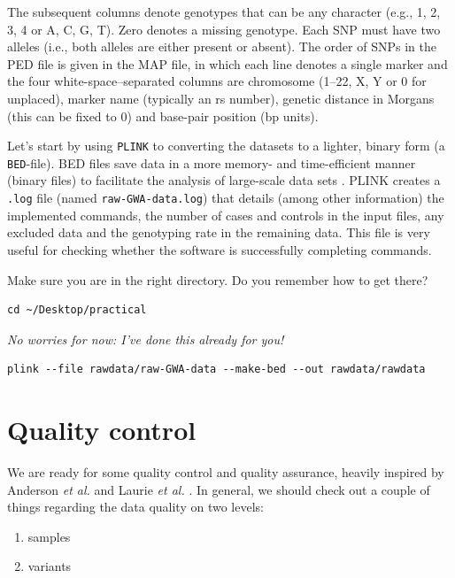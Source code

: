 \documentclass[
]{book}
\providecommand{\tightlist}{%
  \setlength{\itemsep}{0pt}\setlength{\parskip}{0pt}}
\begin{document}
The subsequent columns denote genotypes that can be any character (e.g., 1, 2, 3, 4 or A, C, G, T). Zero denotes a missing genotype. Each SNP must have two alleles (i.e., both alleles are either present or absent).
The order of SNPs in the PED file is given in the MAP file, in which each line denotes a single marker and the four white-space--separated columns are chromosome (1--22, X, Y or 0 for unplaced), marker name (typically an rs number), genetic distance in Morgans (this can be fixed to 0) and base-pair position (bp units).

Let's start by using \texttt{PLINK} to converting the datasets to a lighter, binary form (a \texttt{BED}-file). BED files save data in a more memory- and time-efficient manner (binary files) to facilitate the analysis of large-scale data sets \citep{purcell2007}. PLINK creates a \texttt{.log} file (named \texttt{raw-GWA-data.log}) that details (among other information) the implemented commands, the number of cases and controls in the input files, any excluded data and the genotyping rate in the remaining data. This file is very useful for checking whether the software is successfully completing commands.

Make sure you are in the right directory. Do you remember how to get there?

\begin{verbatim}
cd ~/Desktop/practical
\end{verbatim}

\emph{No worries for now: I've done this already for you!}

\begin{verbatim}
plink --file rawdata/raw-GWA-data --make-bed --out rawdata/rawdata
\end{verbatim}

\hypertarget{quality-control}{%
\section{Quality control}\label{quality-control}}

We are ready for some quality control and quality assurance, heavily inspired by Anderson \emph{et al.} \citep{anderson2010} and Laurie \emph{et al.} \citep{laurie2010}. In general, we should check out a couple of things regarding the data quality on two levels:

\begin{enumerate}
\def\labelenumi{\arabic{enumi})}
\tightlist
\item
  samples
\item
  variants
\end{enumerate}
\end{document}
